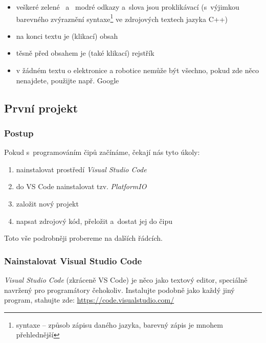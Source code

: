 \begin{itemize} 
\item veškeré \color{mygreen} zelené\color{black} \ a~\color{blue} modré \color{black} 
 \color{black} odkazy a~slova jsou proklikávací (s~výjimkou barevného zvýraznění 
syntaxe\footnote{syntaxe -- způsob zápisu daného jazyka, barevný zápis je mnohem přehlednější} ve zdrojových textech jazyka C++)
\item na konci textu je (klikací) obsah 
\item těsně před obsahem je (také klikací) rejstřík
\item v žádném textu o elektronice a robotice nemůže být všechno, pokud zde něco nenajdete, použijte např. Google
\end{itemize}

\subsection{První projekt}
 

 
\subsubsection*{Postup}

Pokud s~programováním čipů začínáme, čekají nás tyto úkoly:
\begin{enumerate}
\item  nainstalovat prostředí {\it Visual Studio Code}
\item  do VS Code nainstalovat tzv. {\it PlatformIO }
\item  založit nový projekt
\item  napsat zdrojový kód, přeložit a~dostat jej do čipu 
\end{enumerate}
Toto vše podrobněji probereme na dalších řádcích. 

\label{vsc} \subsubsection{Nainstalovat  Visual Studio Code}

{\it Visual Studio Code}  (zkráceně VS Code) 
je něco jako textový editor, speciálně navržený pro programátory čehokoliv.
Instalujte podobně jako každý jiný program, stahujte zde: \url{https://code.visualstudio.com/}  



